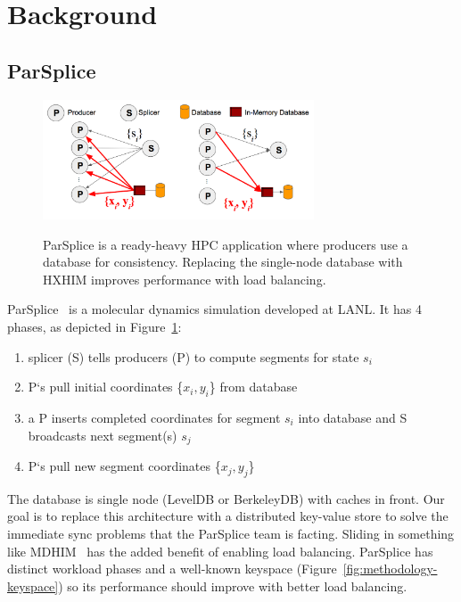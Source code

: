 \section{Background}

\subsection{ParSplice}
\label{sec:parsplice}

\begin{figure}[t]
  \noindent\includegraphics[width=19pc,angle=0]{figures/arch-parsplice.png}\\
  \caption{ParSplice is a ready-heavy HPC application where producers use a
  database for consistency. Replacing the single-node database with HXHIM
  improves performance with load balancing.
  \label{fig:arch-parsplice}}
\end{figure}


ParSplice~\cite{perez:jctc20150parsplice} is a molecular dynamics simulation
developed at LANL. It has 4 phases, as depicted in Figure~\ref{fig:arch-parsplice}:

\begin{enumerate}

  \item splicer (S) tells producers (P) to compute segments for state \(s_i\)

  \item P`s pull initial coordinates \{\(x_i, y_i\)\} from database

  \item a P inserts completed coordinates for segment \(s_i\) into database and
  S broadcasts next segment(s) \(s_j\) 

  \item P`s pull new segment coordinates \{\(x_j, y_j\)\}

\end{enumerate}

The database is single node (LevelDB or BerkeleyDB) with caches in front. Our
goal is to replace this architecture with a distributed key-value store to
solve the immediate sync problems that the ParSplice team is facting. Sliding
in something like MDHIM~\cite{greenberg:hotstorage2015-mdhim} has the added
benefit of enabling load balancing. ParSplice has distinct workload phases and
a well-known keyspace (Figure~\ref{fig:methodology-keyspace}) so its
performance should improve with better load balancing.

